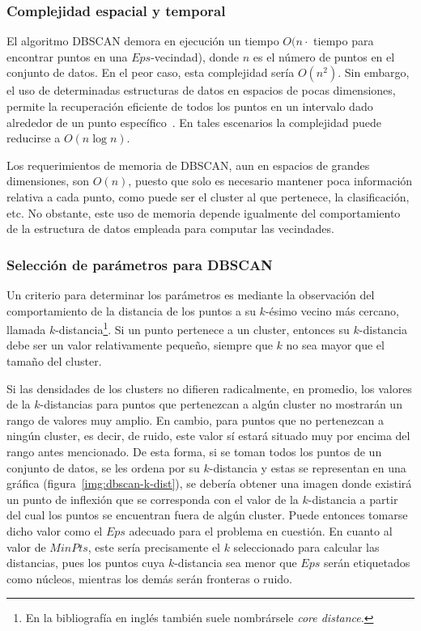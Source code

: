 \subsubsection{Complejidad espacial y temporal}

El algoritmo DBSCAN demora en ejecución un tiempo $O(n \cdot$ tiempo para encontrar puntos en una $Eps$-vecindad), donde $n$ es el número de puntos en el conjunto de datos.
En el peor caso, esta complejidad sería $O(n^2)$.
Sin embargo, el uso de determinadas estructuras de datos en espacios de pocas dimensiones, permite la recuperación eficiente de todos los puntos en un intervalo dado alrededor de un punto específico~\cite{Tan05}.
En tales escenarios la complejidad puede reducirse a $O(n\log n)$.

Los requerimientos de memoria de DBSCAN, aun en espacios de grandes dimensiones, son $O(n)$, puesto que solo es necesario mantener poca información relativa a cada punto, como puede ser el cluster al que pertenece, la clasificación, etc.
No obstante, este uso de memoria depende igualmente del comportamiento de la estructura de datos empleada para computar las vecindades.

\subsubsection{Selección de parámetros para DBSCAN}\label{subsubsec:paramsDBSCAN}

Un criterio para determinar los parámetros es mediante la observación del comportamiento de la distancia de los puntos a su $k$-ésimo vecino más cercano, llamada $k$-distancia\footnote{En la bibliografía en inglés también suele nombrársele \textit{core distance}.}.
Si un punto pertenece a un cluster, entonces su $k$-distancia debe ser un valor relativamente pequeño, siempre que $k$ no sea mayor que el tamaño del cluster.

Si las densidades de los clusters no difieren radicalmente, en promedio, los valores de la $k$-distancias para puntos que pertenezcan a algún cluster no mostrarán un rango de valores muy amplio.
En cambio, para puntos que no pertenezcan a ningún cluster, es decir, de ruido, este valor sí estará situado muy por encima del rango antes mencionado.
De esta forma, si se toman todos los puntos de un conjunto de datos, se les ordena por su $k$-distancia y estas se representan en una gráfica (figura~\ref{img:dbscan-k-dist}), se debería obtener una imagen donde existirá un punto de inflexión que se corresponda con el valor de la $k$-distancia a partir del cual los puntos se encuentran fuera de algún cluster.
Puede entonces tomarse dicho valor como el $Eps$ adecuado para el problema en cuestión.
En cuanto al valor de $MinPts$, este sería precisamente el $k$ seleccionado para calcular las distancias, pues los puntos cuya $k$-distancia sea menor que $Eps$ serán etiquetados como núcleos, mientras los demás serán fronteras o ruido.

